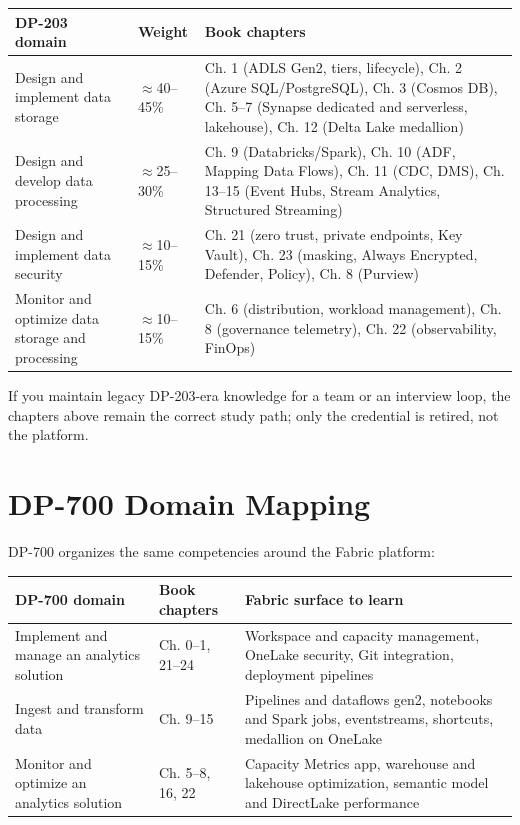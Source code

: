 \begin{center}
\footnotesize
\begin{tabular}{@{}p{4.4cm}p{1.6cm}p{6.8cm}@{}}
\toprule
\textbf{DP-203 domain} & \textbf{Weight} & \textbf{Book chapters} \\
\midrule
Design and implement data storage & $\approx$40--45\% & Ch. 1 (ADLS Gen2, tiers, lifecycle), Ch. 2 (Azure SQL/PostgreSQL), Ch. 3 (Cosmos DB), Ch. 5--7 (Synapse dedicated and serverless, lakehouse), Ch. 12 (Delta Lake medallion) \\
Design and develop data processing & $\approx$25--30\% & Ch. 9 (Databricks/Spark), Ch. 10 (ADF, Mapping Data Flows), Ch. 11 (CDC, DMS), Ch. 13--15 (Event Hubs, Stream Analytics, Structured Streaming) \\
Design and implement data security & $\approx$10--15\% & Ch. 21 (zero trust, private endpoints, Key Vault), Ch. 23 (masking, Always Encrypted, Defender, Policy), Ch. 8 (Purview) \\
Monitor and optimize data storage and processing & $\approx$10--15\% & Ch. 6 (distribution, workload management), Ch. 8 (governance telemetry), Ch. 22 (observability, FinOps) \\
\bottomrule
\end{tabular}
\end{center}

If you maintain legacy DP-203-era knowledge for a team or an interview loop, the chapters above
remain the correct study path; only the credential is retired, not the platform.

\section{DP-700 Domain Mapping}
%
DP-700 organizes the same competencies around the Fabric platform:

\begin{center}
\footnotesize
\begin{tabular}{@{}p{4.4cm}p{3.6cm}p{4.8cm}@{}}
\toprule
\textbf{DP-700 domain} & \textbf{Book chapters} & \textbf{Fabric surface to learn} \\
\midrule
Implement and manage an analytics solution & Ch. 0--1, 21--24 & Workspace and capacity management, OneLake security, Git integration, deployment pipelines \\
Ingest and transform data & Ch. 9--15 & Pipelines and dataflows gen2, notebooks and Spark jobs, eventstreams, shortcuts, medallion on OneLake \\
Monitor and optimize an analytics solution & Ch. 5--8, 16, 22 & Capacity Metrics app, warehouse and lakehouse optimization, semantic model and DirectLake performance \\
\bottomrule
\end{tabular}
\end{center}

